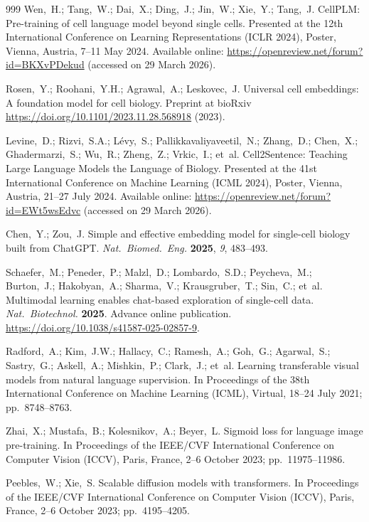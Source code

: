 \begin{thebibliography}{999}
Wen,~H.; Tang,~W.; Dai,~X.; Ding,~J.; Jin,~W.; Xie,~Y.; Tang,~J. CellPLM: Pre-training of cell language model beyond single cells. Presented at the 12th International Conference on Learning Representations (ICLR 2024), Poster, Vienna, Austria, 7--11 May 2024. Available online: \url{https://openreview.net/forum?id=BKXvPDekud} (accessed on 29 March 2026).

Rosen,~Y.; Roohani,~Y.H.; Agrawal,~A.; Leskovec,~J. Universal cell embeddings: A foundation model for cell biology. Preprint at bioRxiv \url{https://doi.org/10.1101/2023.11.28.568918} (2023).

Levine,~D.; Rizvi,~S.A.; L\'{e}vy,~S.; Pallikkavaliyaveetil,~N.; Zhang,~D.; Chen,~X.; Ghadermarzi,~S.; Wu,~R.; Zheng,~Z.; Vrkic,~I.; et~al. Cell2Sentence: Teaching Large Language Models the Language of Biology. Presented at the 41st International Conference on Machine Learning (ICML 2024), Poster, Vienna, Austria, 21--27 July 2024. Available online: \url{https://openreview.net/forum?id=EWt5wsEdvc} (accessed on 29 March 2026).

Chen,~Y.; Zou,~J. Simple and effective embedding model for single-cell biology built from ChatGPT. {\em Nat.\ Biomed.\ Eng.} {\bf 2025}, {\em 9}, 483--493.

Schaefer,~M.; Peneder,~P.; Malzl,~D.; Lombardo,~S.D.; Peycheva,~M.; Burton,~J.; Hakobyan,~A.; Sharma,~V.; Krausgruber,~T.; Sin,~C.; et~al. Multimodal learning enables chat-based exploration of single-cell data. {\em Nat.\ Biotechnol.} {\bf 2025}. Advance online publication. \url{https://doi.org/10.1038/s41587-025-02857-9}.

Radford,~A.; Kim,~J.W.; Hallacy,~C.; Ramesh,~A.; Goh,~G.; Agarwal,~S.; Sastry,~G.; Askell,~A.; Mishkin,~P.; Clark,~J.; et~al. Learning transferable visual models from natural language supervision. In Proceedings of the 38th International Conference on Machine Learning (ICML), Virtual, 18--24 July 2021; pp.\ 8748--8763.

Zhai,~X.; Mustafa,~B.; Kolesnikov,~A.; Beyer,~L. Sigmoid loss for language image pre-training. In Proceedings of the IEEE/CVF International Conference on Computer Vision (ICCV), Paris, France, 2--6 October 2023; pp.\ 11975--11986.

Peebles,~W.; Xie,~S. Scalable diffusion models with transformers. In Proceedings of the IEEE/CVF International Conference on Computer Vision (ICCV), Paris, France, 2--6 October 2023; pp.\ 4195--4205.


\end{thebibliography}

